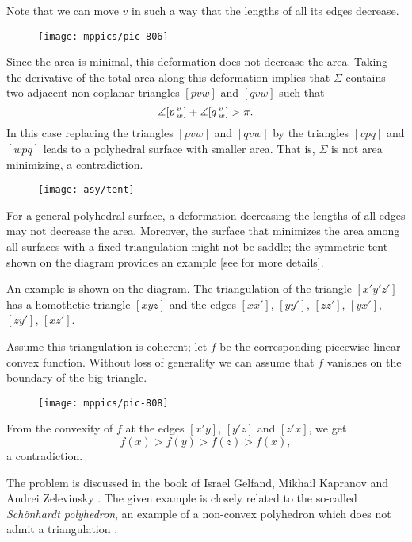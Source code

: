 Note that we can move $v$ in such a way that the lengths of all its edges decrease.

\begin{wrapfigure}{r}{43 mm}
\vskip0mm
\centering
\texttt{[image: mppics/pic-806]}
\end{wrapfigure}

Since the area is minimal,  this deformation does not decrease the area. 
Taking the derivative of the total area along this deformation implies that $\Sigma$
contains two adjacent non-coplanar triangles $[pvw]$ and $[qvw]$ such that
\[\measuredangle [p\,{}^{v}_{w}]+\measuredangle [q\,{}^{v}_{w}]> \pi.\]
In this case replacing the triangles $[pvw]$ and $[qvw]$
by the triangles $[vpq]$ and $[wpq]$
leads to a polyhedral surface with smaller area.
That is, $\Sigma$ is not area minimizing, a contradiction.
\qeds

{

\begin{wrapfigure}{r}{43 mm}
\vskip-8mm
\centering
\texttt{[image: asy/tent]}
\end{wrapfigure}

For a general polyhedral surface, a deformation decreasing the lengths of all edges may not decrease the area.
Moreover, the surface that minimizes the area among all surfaces with a fixed  triangulation might not be saddle;
the symmetric tent shown on the diagram provides an example [see  for more details].


An example is shown on the diagram.
The triangulation of the triangle $[x'y'z']$ has a homothetic triangle $[xyz]$ and the edges
$[xx']$, $[yy']$, $[zz']$, 
$[yx']$, $[zy']$, $[xz']$.

}

\medskip

Assume this triangulation is coherent;
let $f$ be the corresponding piecewise linear convex function.
Without loss of generality we can assume that $f$ vanishes on the boundary of the big triangle.

\begin{wrapfigure}{r}{33 mm}
\vskip0mm
\centering
\texttt{[image: mppics/pic-808]}
\end{wrapfigure}

From the convexity of $f$ at the edges $[x'y]$,  $[y'z]$ and $[z'x]$, we get 
\[f(x)>f(y)>f(z)>f(x),\]
a contradiction.
\qeds

The problem is discussed in the book of 
Israel Gelfand, 
Mikhail Kapranov 
and Andrei Zelevinsky  \cite[see 7C in][]{GKZ}.
The given example is closely related to the so-called \emph{Sch\"onhardt polyhedron}, an example of a non-convex polyhedron which does not admit a triangulation \cite{schoenhardt}.

